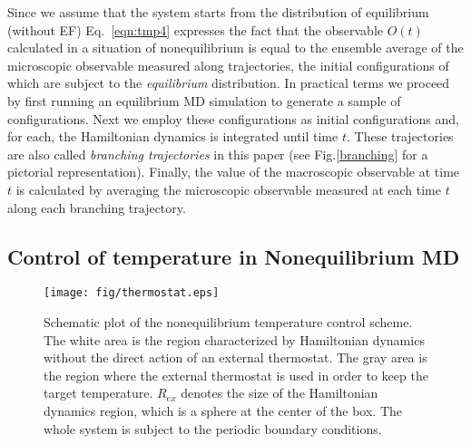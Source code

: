 \documentclass[a4paper,preprint,unsortedaddress,onecolumn]{revtex4-1}
\newcommand{\vect}[1]{\textbf{\textit{#1}}}
\begin{document}
Since we assume that the system starts from the distribution of equilibrium (without EF)
 Eq.~\eqref{eqn:tmp4} expresses the fact that the 
observable $O(t)$ calculated in a situation of nonequilibrium is equal to the ensemble average of
the microscopic observable measured along trajectories, the
initial configurations of which are subject to the \emph{equilibrium}
distribution. In practical terms we proceed by first running an equilibrium MD simulation
to generate a sample of configurations. Next we employ these configurations as
initial configurations and, for each, the Hamiltonian dynamics is integrated until
time $t$. These trajectories are also called \emph{branching
  trajectories} in this paper (see Fig.\ref{branching} for a pictorial representation). 
Finally, the value of the macroscopic observable at time $t$ is
calculated by averaging the microscopic observable measured at each time $t$ along each branching trajectory.



\subsection{Control of temperature in Nonequilibrium MD}\label{sec:tmp2b}


\begin{figure}
  \centering
  \texttt{[image: fig/thermostat.eps]}
  \caption{Schematic plot of the nonequilibrium temperature control scheme.
    The white area is the region characterized by Hamiltonian dynamics without the direct action of an external thermostat.
    The gray area is the region where the external thermostat is used in order to keep the target temperature.
    $R_{ex}$ denotes the size of the Hamiltonian dynamics region, which
    is a sphere at the center of the box.
    The whole system is subject to the periodic boundary conditions. }
  \label{fig:tmp2}
\end{figure}
\end{document}
